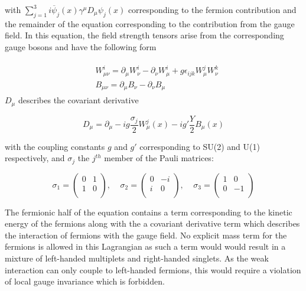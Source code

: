 \documentclass[12pt,a4paper,epsf,portrait,times,epsfig]{report}
\begin{document}
		with $\sum_{j=1}^{3}i\overline{\psi}_{j}(x)\gamma^{\mu}D_{\mu}\psi_{j}(x)$ corresponding to the fermion contribution and the remainder of the equation corresponding to the contribution from the gauge field. In this equation, the field strength tensors arise from the corresponding gauge bosons and have the following form
		
		\begin{align}
			\begin{split}
				&W_{\mu\nu}^{i} = \partial_{\mu}W_{\nu}^{i}-\partial_{\nu}W_{\mu}^{i}+g\epsilon_{ijk}W_{\mu}^{j}W_{\nu}^{k} \\
				&B_{\mu\nu} = \partial_{\mu}B_{\nu}-\partial_{\nu}B_{\mu}
			\end{split}
		\end{align}
			$D_{\mu}$ describes the covariant derivative
		
		\begin{center}
			\begin{equation}
				D_{\mu} = \partial_{\mu}-ig\frac{\sigma_{j}}{2}W_{\mu}^{j}(x)-ig'\frac{Y}{2}B_{\mu}(x)
			\end{equation}
		\end{center}
		
		with the coupling constants $g$ and $g'$ corresponding to SU(2) and U(1) respectively, and $\sigma_{j}$ the $j^{th}$ member of the Pauli matrices:
		
		\begin{center}
			\begin{equation}
				\sigma_{1}=\begin{pmatrix}
				0 & 1 \\
				1 & 0  \\
				\end{pmatrix},\;\;\;\;\sigma_{2}=\begin{pmatrix}
				0 & -i \\
				i & 0 \\
				\end{pmatrix},\;\;\;\;\sigma_{3}=\begin{pmatrix}
				1 & 0 \\
				0 & -1 \\
				\end{pmatrix}
			\end{equation}
		\end{center} The fermionic half of the equation contains a term corresponding to the kinetic energy of the fermions along with the a covariant derivative term which describes the interaction of fermions with the gauge field. No explicit mass term for the fermions is allowed in this Lagrangian as such a term would would result in a mixture of left-handed multiplets and right-handed singlets. As the weak interaction can only couple to left-handed fermions, this would require a violation of local gauge invariance which is forbidden. \par
		
\end{document}
